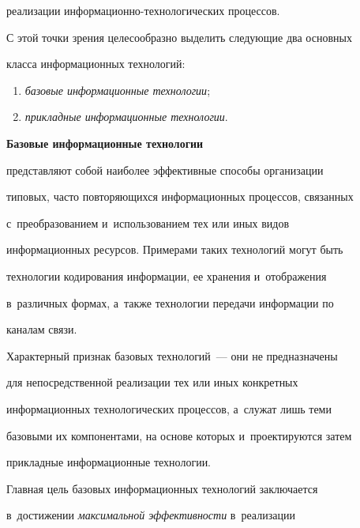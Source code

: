 реализации ин\-фор\-ма\-ци\-он\-но-тех\-но\-ло\-ги\-че\-ских процессов. 


   


   С этой точки зрения целесообразно выделить сле\-ду\-ющие два основных 


класса информационных технологий:


   \begin{enumerate}[(1)]


   \item \textit{базовые информационные технологии};


\item \textit{прикладные информационные технологии}.


\end{enumerate}





\textbf{Базовые информационные технологии}


пред\-став\-ля\-ют собой наиболее эффективные способы организации 


типовых, час\-то по\-вто\-ря\-ющих\-ся информационных процессов, связанных 


с~преобразованием и~использованием тех или иных видов 


информационных ресурсов. Примерами таких технологий могут быть 


технологии кодирования информации, ее хранения и~отображения 


в~различных формах, а~так\-же технологии передачи информации по 


каналам \mbox{связи}. 


   


   Характерный признак базовых технологий~--- они не пред\-на\-зна\-че\-ны 


для непосредственной реализации тех или иных конкретных 


информационных технологических процессов, а~служат лишь теми 


базовыми их компонентами, на основе которых и~проектируются затем 


при\-клад\-ные информационные технологии. 


   


   Главная цель базовых информационных технологий заключается 


в~достижении \textit{максимальной эф\-фек\-тив\-ности} в~реализации 


